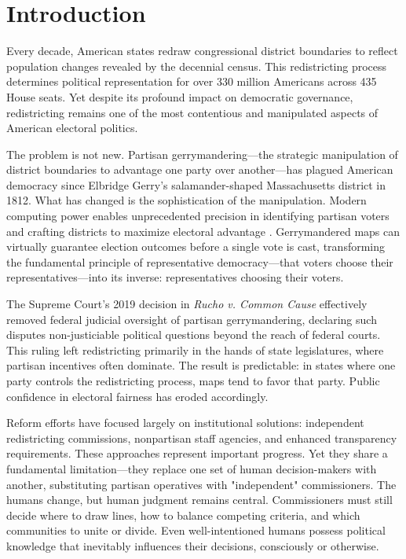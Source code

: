 \section{Introduction}

Every decade, American states redraw congressional district boundaries to reflect population changes revealed by the decennial census. This redistricting process determines political representation for over 330 million Americans across 435 House seats. Yet despite its profound impact on democratic governance, redistricting remains one of the most contentious and manipulated aspects of American electoral politics.

The problem is not new. Partisan gerrymandering—the strategic manipulation of district boundaries to advantage one party over another—has plagued American democracy since Elbridge Gerry's salamander-shaped Massachusetts district in 1812. What has changed is the sophistication of the manipulation. Modern computing power enables unprecedented precision in identifying partisan voters and crafting districts to maximize electoral advantage \cite{daley2021unrigging}. Gerrymandered maps can virtually guarantee election outcomes before a single vote is cast, transforming the fundamental principle of representative democracy—that voters choose their representatives—into its inverse: representatives choosing their voters.

The Supreme Court's 2019 decision in \textit{Rucho v. Common Cause} \cite{rucho2019} effectively removed federal judicial oversight of partisan gerrymandering, declaring such disputes non-justiciable political questions beyond the reach of federal courts. This ruling left redistricting primarily in the hands of state legislatures, where partisan incentives often dominate. The result is predictable: in states where one party controls the redistricting process, maps tend to favor that party. Public confidence in electoral fairness has eroded accordingly.

Reform efforts have focused largely on institutional solutions: independent redistricting commissions, nonpartisan staff agencies, and enhanced transparency requirements. These approaches represent important progress. Yet they share a fundamental limitation—they replace one set of human decision-makers with another, substituting partisan operatives with "independent" commissioners. The humans change, but human judgment remains central. Commissioners must still decide where to draw lines, how to balance competing criteria, and which communities to unite or divide. Even well-intentioned humans possess political knowledge that inevitably influences their decisions, consciously or otherwise.

